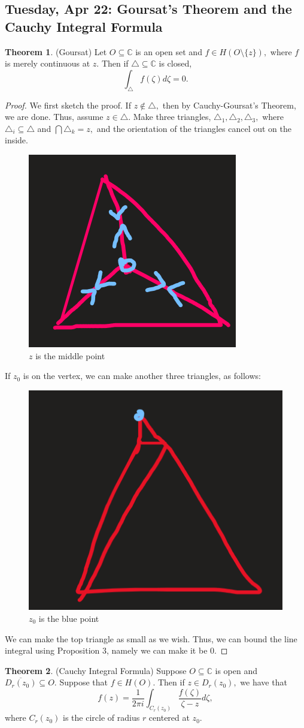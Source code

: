 \documentclass[10pt, oneside]{article}
\newcommand{\bbC}{\mathbb{C}}
\newcommand{\sm}{\setminus}
\theoremstyle{definition}
\newtheorem{thm}{Theorem}
\begin{document}
\newpage
\subsection{Tuesday, Apr 22: Goursat's Theorem and the Cauchy Integral Formula}
\begin{thm}
    (Goursat) Let $O \subseteq \bbC$ is an open set and $f\in H(O \sm \{z\}),$ where $f$ is merely continuous at $z.$ Then if $\triangle \subseteq \bbC$ is closed,
    \[\int_{\triangle} f(\zeta)d\zeta = 0.\]
\end{thm}
\begin{proof}
We first sketch the proof.
    If $z \notin \triangle,$ then by Cauchy-Goursat's Theorem, we are done. Thus, assume $z\in \triangle.$ Make three triangles, $\triangle_1, \triangle_2, \triangle_3,$ where $\triangle_i \subseteq \triangle$ and $\bigcap \triangle_k = z,$ and the orientation of the triangles cancel out on the inside.  
    \begin{figure}[H]
        \centering
        \includegraphics[width=0.25\linewidth]{Images/Goursat2.png}
        \caption{$z$ is the middle point}
    \end{figure}
    If $z_0$ is on the vertex, we can make another three triangles, as follows: 
    \begin{figure}[H]
        \centering
        \includegraphics[width=0.25\linewidth]{Images/Gorusat3.png}
        \caption{$z_0$ is the blue point}
    \end{figure}
    We can make the top triangle as small as we wish. Thus, we can bound the line integral using Proposition 3, namely we can make it be $0.$ 
\end{proof}
\begin{thm}
(Cauchy Integral Formula)
    Suppose $O \subseteq \bbC$ is open and $\overline{D_r(z_0)} \subseteq O.$ Suppose that $f\in H(O).$ Then if $z\in D_r(z_0),$ we have that 
    \[f(z) = \frac{1}{2\pi i }\int_{C_r(z_0)}\frac{f(\zeta)}{\zeta - z}d\zeta,\] where $C_r(z_0)$ is the circle of radius $r$ centered at $z_0. $
\end{thm}
\end{document}
